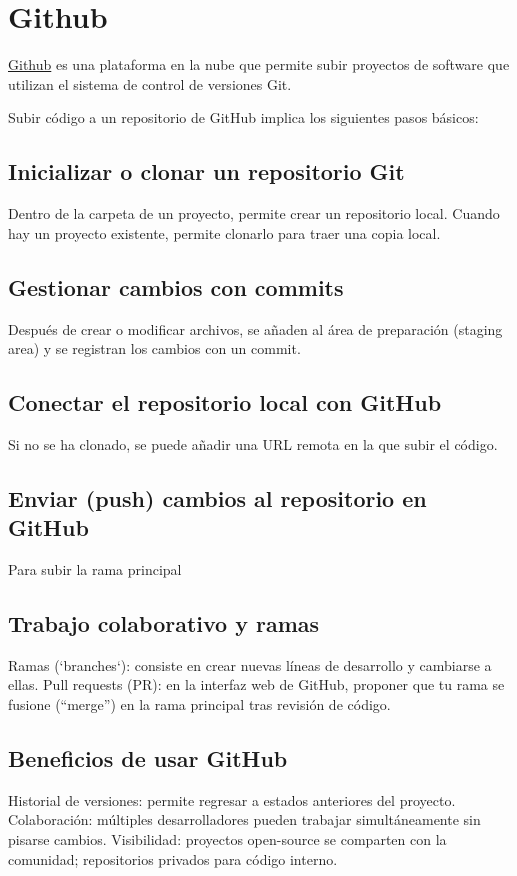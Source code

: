 
\section{Github}\label{github}
\href{https://github.com/}{Github} es una plataforma en la nube que permite subir proyectos de software que utilizan el sistema de control de versiones Git. 


Subir código a un repositorio de GitHub implica los siguientes pasos básicos:

\subsection{Inicializar o clonar un repositorio Git}
Dentro de la carpeta de un proyecto, permite crear un repositorio local.
Cuando hay un proyecto existente, permite clonarlo para traer una copia local.

\subsection{Gestionar cambios con commits}
Después de crear o modificar archivos, se añaden al área de preparación (staging area) y se registran los cambios con un commit.

\subsection{Conectar el repositorio local con GitHub}
Si no se ha clonado, se puede añadir una URL remota en la que subir el código.

\subsection{Enviar (push) cambios al repositorio en GitHub}
Para subir la rama principal

\subsection{Trabajo colaborativo y ramas}
Ramas (`branches`): consiste en crear nuevas líneas de desarrollo y cambiarse a ellas.
Pull requests (PR): en la interfaz web de GitHub, proponer que tu rama se fusione (“merge”) en la rama principal tras revisión de código.

\subsection{Beneficios de usar GitHub}
Historial de versiones: permite regresar a estados anteriores del proyecto.
Colaboración: múltiples desarrolladores pueden trabajar simultáneamente sin pisarse cambios.
Visibilidad: proyectos open-source se comparten con la comunidad; repositorios privados para código interno.

